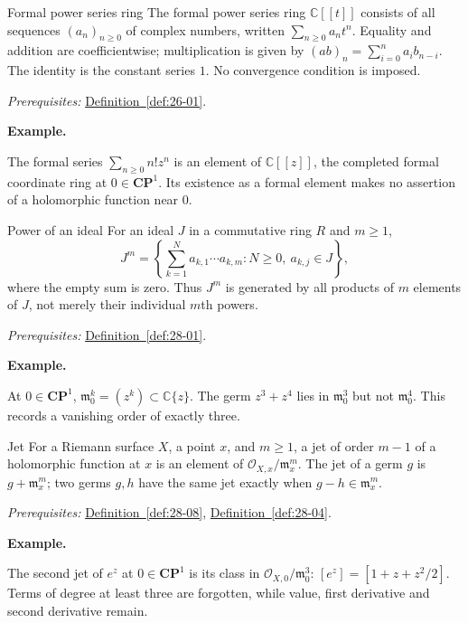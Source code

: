 \documentclass[11pt]{article}
\makeatletter
\newcommand{\C}{\mathbb C}
\newcounter{definition}
\newcommand{\CP}{\mathbf{CP}}
\newcommand{\exampleheading}{\par\medskip\textbf{Example.}\par\smallskip}
\newcommand{\currentdefinition}[1]{\protected@edef\@currentlabel{#1}}
\makeatother
\begin{document}
\begin{definitionbox}{Formal power series ring}
\currentdefinition{\thedefinition}
\label{def:28-07}
The formal power series ring $\C[[t]]$ consists of all sequences $(a_n)_{n\ge0}$ of complex numbers, written $\sum_{n\ge0}a_nt^n$. Equality and addition are coefficientwise; multiplication is given by $(ab)_n=\sum_{i=0}^n a_i b_{n-i}$. The identity is the constant series $1$. No convergence condition is imposed.

\smallskip
\textit{Prerequisites:} \hyperref[def:26-01]{Definition~\ref*{def:26-01}}.

\exampleheading
The formal series $\sum_{n\ge0}n!z^n$ is an element of $\C[[z]]$, the completed formal coordinate ring at $0\in\CP^1$. Its existence as a formal element makes no assertion of a holomorphic function near 0.
\end{definitionbox}

\begin{definitionbox}{Power of an ideal}
\currentdefinition{\thedefinition}
\label{def:28-08}
For an ideal $J$ in a commutative ring $R$ and $m\ge1$,
\[J^m=\left\{\sum_{k=1}^{N}a_{k,1}\cdots a_{k,m}:N\ge0,\ a_{k,j}\in J\right\},\]
where the empty sum is zero. Thus $J^m$ is generated by all products of $m$ elements of $J$, not merely their individual $m$th powers.

\smallskip
\textit{Prerequisites:} \hyperref[def:28-01]{Definition~\ref*{def:28-01}}.

\exampleheading
At $0\in\CP^1$, $\mathfrak m_0^k=(z^k)\subset\C\{z\}$. The germ $z^3+z^4$ lies in $\mathfrak m_0^3$ but not $\mathfrak m_0^4$. This records a vanishing order of exactly three.
\end{definitionbox}

\begin{definitionbox}{Jet}
\currentdefinition{\thedefinition}
\label{def:28-09}
For a Riemann surface $X$, a point $x$, and $m\ge1$, a jet of order $m-1$ of a holomorphic function at $x$ is an element of $\mathcal O_{X,x}/\mathfrak m_x^m$. The jet of a germ $g$ is $g+\mathfrak m_x^m$; two germs $g,h$ have the same jet exactly when $g-h\in\mathfrak m_x^m$.

\smallskip
\textit{Prerequisites:} \hyperref[def:28-08]{Definition~\ref*{def:28-08}}, \hyperref[def:28-04]{Definition~\ref*{def:28-04}}.

\exampleheading
The second jet of $e^z$ at $0\in\CP^1$ is its class in $\mathcal O_{X,0}/\mathfrak m_0^3$: $[e^z]=[1+z+z^2/2]$. Terms of degree at least three are forgotten, while value, first derivative and second derivative remain.
\end{definitionbox}
\end{document}
